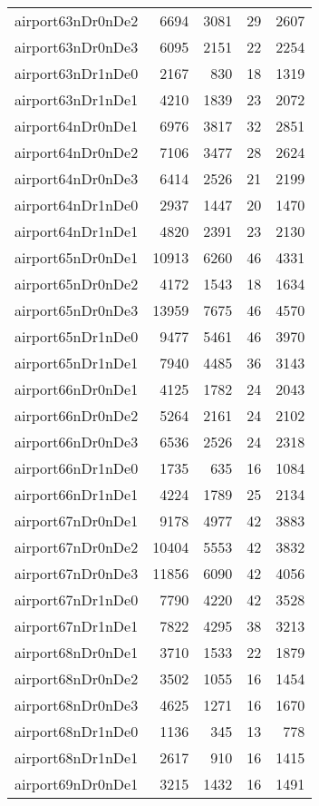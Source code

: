 \begin{longtable}{lrrrr}
airport63nDr0nDe2 & 6694 & 3081 & 29 & 2607 \\
airport63nDr0nDe3 & 6095 & 2151 & 22 & 2254 \\
airport63nDr1nDe0 & 2167 & 830 & 18 & 1319 \\
airport63nDr1nDe1 & 4210 & 1839 & 23 & 2072 \\
airport64nDr0nDe1 & 6976 & 3817 & 32 & 2851 \\
airport64nDr0nDe2 & 7106 & 3477 & 28 & 2624 \\
airport64nDr0nDe3 & 6414 & 2526 & 21 & 2199 \\
airport64nDr1nDe0 & 2937 & 1447 & 20 & 1470 \\
airport64nDr1nDe1 & 4820 & 2391 & 23 & 2130 \\
airport65nDr0nDe1 & 10913 & 6260 & 46 & 4331 \\
airport65nDr0nDe2 & 4172 & 1543 & 18 & 1634 \\
airport65nDr0nDe3 & 13959 & 7675 & 46 & 4570 \\
airport65nDr1nDe0 & 9477 & 5461 & 46 & 3970 \\
airport65nDr1nDe1 & 7940 & 4485 & 36 & 3143 \\
airport66nDr0nDe1 & 4125 & 1782 & 24 & 2043 \\
airport66nDr0nDe2 & 5264 & 2161 & 24 & 2102 \\
airport66nDr0nDe3 & 6536 & 2526 & 24 & 2318 \\
airport66nDr1nDe0 & 1735 & 635 & 16 & 1084 \\
airport66nDr1nDe1 & 4224 & 1789 & 25 & 2134 \\
airport67nDr0nDe1 & 9178 & 4977 & 42 & 3883 \\
airport67nDr0nDe2 & 10404 & 5553 & 42 & 3832 \\
airport67nDr0nDe3 & 11856 & 6090 & 42 & 4056 \\
airport67nDr1nDe0 & 7790 & 4220 & 42 & 3528 \\
airport67nDr1nDe1 & 7822 & 4295 & 38 & 3213 \\
airport68nDr0nDe1 & 3710 & 1533 & 22 & 1879 \\
airport68nDr0nDe2 & 3502 & 1055 & 16 & 1454 \\
airport68nDr0nDe3 & 4625 & 1271 & 16 & 1670 \\
airport68nDr1nDe0 & 1136 & 345 & 13 & 778 \\
airport68nDr1nDe1 & 2617 & 910 & 16 & 1415 \\
airport69nDr0nDe1 & 3215 & 1432 & 16 & 1491 \\

\end{longtable}
